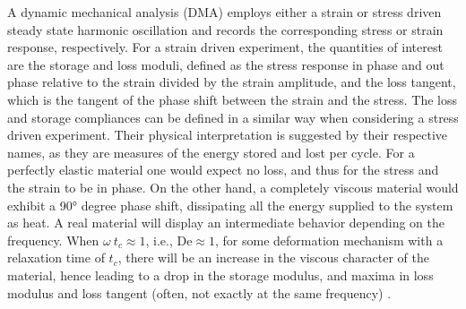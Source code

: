 A dynamic mechanical analysis (DMA) employs either a strain or stress driven steady state harmonic oscillation and records the corresponding stress or strain response, respectively.
For a strain driven experiment, the quantities of interest are the storage and loss moduli, defined as the stress response in phase and out phase relative to the strain divided by the strain amplitude, and the loss tangent, which is the tangent of the phase shift between the strain and the stress.
The loss and storage compliances can be defined in a similar way when considering a stress driven experiment.
Their physical interpretation is suggested by their respective names, as they are measures of the energy stored and lost per cycle.
For a perfectly elastic material one would expect no loss, and thus for the stress and the strain to be in phase.
On the other hand, a completely viscous material would exhibit a 90° degree phase shift, dissipating all the energy supplied to the system as heat.
A real material will display an intermediate behavior depending on the frequency.
When $\omega\ t_c \approx 1$, i.e., $\mathrm{De} \approx 1$, for some deformation mechanism with a relaxation time of $t_c$, there will be an increase in the viscous character of the material, hence leading to a drop in  the storage modulus, and maxima in loss modulus and loss tangent (often, not exactly at the same frequency) \citep{ferryViscoelasticPropertiesPolymers1980}.

